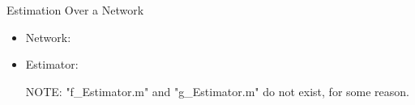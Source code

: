 \begin{example}{Estimation Over a Network}
\begin{itemize}





\item Network:






\item Estimator:

{\color{red} NOTE: "f\_Estimator.m" and "g\_Estimator.m" do not exist, for some reason.}




\end{itemize}

\end{example}